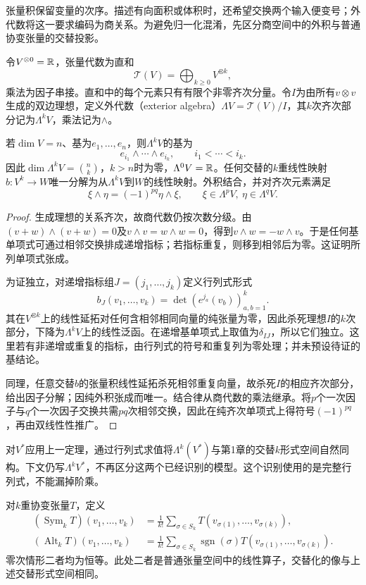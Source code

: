 张量积保留变量的次序。描述有向面积或体积时，还希望交换两个输入便变号；外代数将这一要求编码为商关系。为避免归一化混淆，先区分商空间中的外积与普通协变张量的交替投影。
\begin{definition}[张量代数与外代数]
令$V^{\otimes0}=\mathbb{R}$，张量代数为直和
\[
 \mathcal T(V)=\bigoplus_{k\geq0}V^{\otimes k},
\]
乘法为因子串接。直和中的每个元素只有有限个非零齐次分量。令$I$为由所有$v\otimes v$生成的双边理想，定义外代数（exterior algebra）$\Lambda V=\mathcal T(V)/I$，其$k$次齐次部分记为$\Lambda^kV$，乘法记为$\wedge$。
\end{definition}
\begin{theorem}[外代数的基与泛性质]\label{thm:exterior-universal}
若$\dim V=n$、基为$e_1,\ldots,e_n$，则$\Lambda^kV$的基为
\[
 e_{i_1}\wedge\cdots\wedge e_{i_k},\qquad i_1<\cdots<i_k.
\]
因此$\dim\Lambda^kV=\binom nk$，$k>n$时为零，$\Lambda^0V=\mathbb{R}$。任何交替的$k$重线性映射$b:V^k\to W$唯一分解为从$\Lambda^kV$到$W$的线性映射。外积结合，并对齐次元素满足
\[
 \xi\wedge\eta=(-1)^{pq}\eta\wedge\xi,
 \qquad\xi\in\Lambda^pV,\ \eta\in\Lambda^qV.
\]
\end{theorem}
\begin{proof}
生成理想的关系齐次，故商代数仍按次数分级。由$(v+w)\wedge(v+w)=0$及$v\wedge v=w\wedge w=0$，得到$v\wedge w=-w\wedge v$。于是任何基单项式可通过相邻交换排成递增指标；若指标重复，则移到相邻后为零。这证明所列单项式张成。

为证独立，对递增指标组$J=(j_1,\ldots,j_k)$定义行列式形式
\[
 b_J(v_1,\ldots,v_k)=\det(e^{j_a}(v_b))_{a,b=1}^k.
\]
其在$V^{\otimes k}$上的线性延拓对任何含相邻相同向量的纯张量为零，因此杀死理想$I$的$k$次部分，下降为$\Lambda^kV$上的线性泛函。在递增基单项式上取值为$\delta_{IJ}$，所以它们独立。这里若有非递增或重复的指标，由行列式的符号和重复列为零处理；并未预设待证的基结论。

同理，任意交替$b$的张量积线性延拓杀死相邻重复向量，故杀死$I$的相应齐次部分，给出因子分解；因纯外积张成而唯一。结合律从商代数的乘法继承。将$p$个一次因子与$q$个一次因子交换共需$pq$次相邻交换，因此在纯齐次单项式上得符号$(-1)^{pq}$，再由双线性性推广。
\end{proof}
对$V^*$应用上一定理，通过行列式求值将$\Lambda^k(V^*)$与第1章的交替$k$形式空间自然同构。下文仍写$\Lambda^kV^*$，不再区分这两个已经识别的模型。这个识别使用的是完整行列式，不能漏掉阶乘。
\begin{definition}[对称化与交替化]
对$k$重协变张量$T$，定义
\begin{align*}
 (\operatorname{Sym}_kT)(v_1,\ldots,v_k)
 &=\frac1{k!}\sum_{\sigma\in S_k}T(v_{\sigma(1)},\ldots,v_{\sigma(k)}),\\
 (\operatorname{Alt}_kT)(v_1,\ldots,v_k)
 &=\frac1{k!}\sum_{\sigma\in S_k}\operatorname{sgn}(\sigma)
 T(v_{\sigma(1)},\ldots,v_{\sigma(k)}).
\end{align*}
零次情形二者均为恒等。此处二者是普通张量空间中的线性算子，交替化的像与上述交替形式空间相同。
\end{definition}
